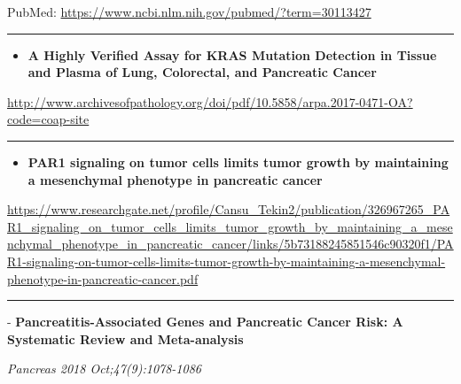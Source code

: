 \documentclass[]{article}
\providecommand{\tightlist}{%
  \setlength{\itemsep}{0pt}\setlength{\parskip}{0pt}}
\begin{document}
PubMed: \url{https://www.ncbi.nlm.nih.gov/pubmed/?term=30113427}

{}

{}

\begin{center}\rule{0.5\linewidth}{\linethickness}\end{center}

\begin{itemize}
\tightlist
\item
  \textbf{A Highly Verified Assay for KRAS Mutation Detection in Tissue
  and Plasma of Lung, Colorectal, and Pancreatic Cancer}
\end{itemize}

\url{http://www.archivesofpathology.org/doi/pdf/10.5858/arpa.2017-0471-OA?code=coap-site}

\begin{center}\rule{0.5\linewidth}{\linethickness}\end{center}

\begin{itemize}
\tightlist
\item
  \textbf{PAR1 signaling on tumor cells limits tumor growth by
  maintaining a mesenchymal phenotype in pancreatic cancer}
\end{itemize}

\url{https://www.researchgate.net/profile/Cansu_Tekin2/publication/326967265_PAR1_signaling_on_tumor_cells_limits_tumor_growth_by_maintaining_a_mesenchymal_phenotype_in_pancreatic_cancer/links/5b73188245851546c90320f1/PAR1-signaling-on-tumor-cells-limits-tumor-growth-by-maintaining-a-mesenchymal-phenotype-in-pancreatic-cancer.pdf}

\begin{center}\rule{0.5\linewidth}{\linethickness}\end{center}

 - \textbf{Pancreatitis-Associated Genes and Pancreatic Cancer Risk: A
Systematic Review and Meta-analysis}

\emph{Pancreas 2018 Oct;47(9):1078-1086}
\end{document}
